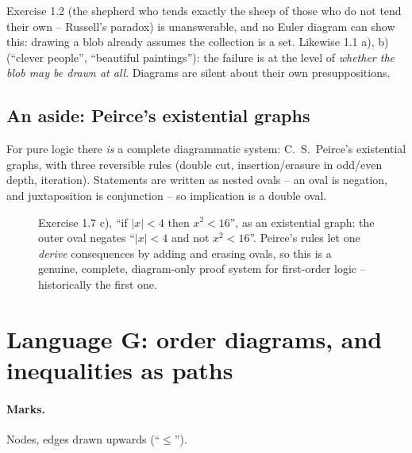 \begin{trap}
Exercise 1.2 (the shepherd who tends exactly the sheep of those who do not tend their
own -- Russell's paradox) is unanswerable, and no Euler diagram can show this: drawing a
blob already assumes the collection is a set. Likewise 1.1 a), b) (``clever people'',
``beautiful paintings''): the failure is at the level of \emph{whether the blob may be
drawn at all}. Diagrams are silent about their own presuppositions.
\end{trap}

\subsection*{An aside: Peirce's existential graphs}

For pure logic there \emph{is} a complete diagrammatic system: C.\ S.\ Peirce's
existential graphs, with three reversible rules (double cut, insertion/erasure in odd/even
depth, iteration). Statements are written as nested ovals -- an oval is negation, and
juxtaposition is conjunction -- so implication is a double oval.

\begin{figure}[H]
\centering
{}
\caption{Exercise 1.7 c), ``if $|x|<4$ then $x^{2}<16$'', as an existential graph: the
outer oval negates ``$|x|<4$ and not $x^{2}<16$''. Peirce's rules let one \emph{derive}
consequences by adding and erasing ovals, so this is a genuine, complete, diagram-only
proof system for first-order logic -- historically the first one.}
\label{fig:peirce}
\end{figure}

\section{Language G: order diagrams, and inequalities as paths}
\label{sec:hasse}

\paragraph{Marks.} Nodes, edges drawn upwards (``$\le$'').
